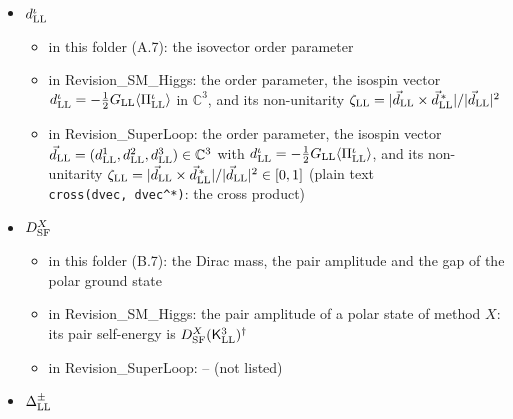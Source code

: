 \documentclass[
  10pt,
]{article}
\providecommand{\tightlist}{%
  \setlength{\itemsep}{0pt}\setlength{\parskip}{0pt}}
\begin{document}
\begin{itemize}
  \begin{itemize}
  \tightlist
  \item
    in this folder (B.7): the chemical potentials of the four charges,
    their susceptibilities, the mass matrix (B.23), the four gauge
    fields and their couplings
  \item
    in Revision\_SM\_Higgs: the charge matrices of the four gauge fields
    (\(a=1,2,3\): \(\mathsf 1_4\otimes\tfrac12\tau^{\rm LL}_a\);
    \(a={\rm F}\): \(\mathsf 1_8\)), the chemical potentials of the
    charges \(\Psi^\dagger_{\rm LL}\mathsf q^a_{\rm SF}\Psi_{\rm LL}\),
    and the static susceptibilities
    \(\chi^{ab}_{\rm SF}=\partial\langle\Psi^\dagger_{\rm LL}\mathsf q^a_{\rm SF}\Psi_{\rm LL}\rangle/\partial\mu^b_{\rm SF}\)
    at \(\mu^b_{\rm SF}=0\)
  \item
    in Revision\_SuperLoop: -- (not listed)
  \end{itemize}
\item
  \(d^\iota_{\rm LL}\)

  \begin{itemize}
  \tightlist
  \item
    in this folder (A.7): the isovector order parameter
  \item
    in Revision\_SM\_Higgs: the order parameter, the isospin vector
    \(d^\iota_{\rm LL}=-\tfrac12G_{\rm LL}\langle\Pi^\iota_{\rm LL}\rangle\)
    in \(\mathbb C^3\), and its non-unitarity
    \(\zeta_{\rm LL}=\lvert\vec d_{\rm LL}\times\vec d^{\,*}_{\rm LL}\rvert/\lvert\vec d_{\rm LL}\rvert^2\)
  \item
    in Revision\_SuperLoop: the order parameter, the isospin vector
    \(\vec d_{\rm LL}=(d^1_{\rm LL},d^2_{\rm LL},d^3_{\rm LL})\in\mathbb C^3\)
    with
    \(d^\iota_{\rm LL}=-\tfrac12G_{\rm LL}\langle\Pi^\iota_{\rm LL}\rangle\),
    and its non-unitarity
    \(\zeta_{\rm LL}=\lvert\vec d_{\rm LL}\times\vec d^{\,*}_{\rm LL}\rvert/\lvert\vec d_{\rm LL}\rvert^2\in[0,1]\)
    (plain text \texttt{cross(dvec,\ dvec\^{}*)}: the cross product)
  \end{itemize}
\item
  \(D^X_{\rm SF}\)

  \begin{itemize}
  \tightlist
  \item
    in this folder (B.7): the Dirac mass, the pair amplitude and the gap
    of the polar ground state
  \item
    in Revision\_SM\_Higgs: the pair amplitude of a polar state of
    method \(X\): its pair self-energy is
    \(D^X_{\rm SF}(\mathsf K^3_{\rm LL})^\dagger\)
  \item
    in Revision\_SuperLoop: -- (not listed)
  \end{itemize}
\item
  \(\Delta^\pm_{\rm LL}\)


\end{itemize}
\end{document}
